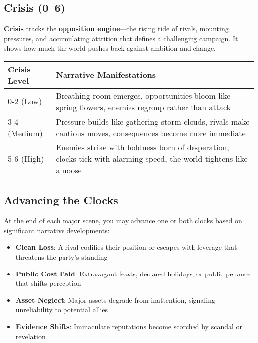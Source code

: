 \subsection*{Crisis (0--6)}

\textbf{Crisis} tracks the \textbf{opposition engine}—the rising tide of rivals, mounting pressures, and accumulating attrition that defines a challenging campaign. It shows how much the world pushes back against ambition and change.

\begin{fatebox}
\begin{tabularx}{\textwidth}{lX}
\toprule
\textbf{Crisis Level} & \textbf{Narrative Manifestations} \\
\midrule
0-2 (Low) & Breathing room emerges, opportunities bloom like spring flowers, enemies regroup rather than attack \\
3-4 (Medium) & Pressure builds like gathering storm clouds, rivals make cautious moves, consequences become more immediate \\
5-6 (High) & Enemies strike with boldness born of desperation, clocks tick with alarming speed, the world tightens like a noose \\
\bottomrule
\end{tabularx}
\end{fatebox}

\subsection*{Advancing the Clocks}

At the end of each major scene, you may advance one or both clocks based on significant narrative developments:

\begin{itemize}
    \item \textbf{Clean Loss}: A rival codifies their position or escapes with leverage that threatens the party's standing
    \item \textbf{Public Cost Paid}: Extravagant feasts, declared holidays, or public penance that shifts perception
    \item \textbf{Asset Neglect}: Major assets degrade from inattention, signaling unreliability to potential allies
    \item \textbf{Evidence Shifts}: Immaculate reputations become scorched by scandal or revelation
\end{itemize}

